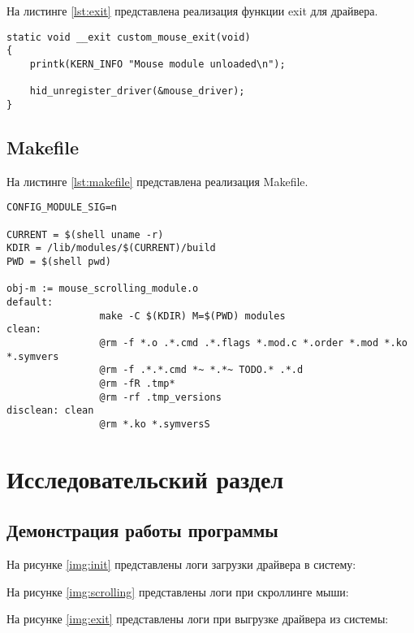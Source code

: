 \documentclass{bmstu}
\begin{document}
\clearpage

На листинге \ref{lst:exit} представлена реализация функции exit для драйвера.

\begin{lstlisting}[caption={Реализация функции exit}, label=lst:exit]
static void __exit custom_mouse_exit(void)
{
    printk(KERN_INFO "Mouse module unloaded\n");

    hid_unregister_driver(&mouse_driver);
}
\end{lstlisting}


\section{Makefile}

На листинге \ref{lst:makefile} представлена реализация Makefile.

\begin{lstlisting}[caption={Makefile}, label=lst:makefile]
CONFIG_MODULE_SIG=n

CURRENT = $(shell uname -r)
KDIR = /lib/modules/$(CURRENT)/build
PWD = $(shell pwd)

obj-m := mouse_scrolling_module.o
default: 
				make -C $(KDIR) M=$(PWD) modules 
clean: 
				@rm -f *.o .*.cmd .*.flags *.mod.c *.order *.mod *.ko *.symvers 
				@rm -f .*.*.cmd *~ *.*~ TODO.* .*.d
				@rm -fR .tmp* 
				@rm -rf .tmp_versions 
disclean: clean 
				@rm *.ko *.symversS
\end{lstlisting}

\chapter{Исследовательский раздел}

\section{Демонстрация работы программы}

На рисунке \ref{img:init} представлены логи загрузки драйвера в систему:


На рисунке \ref{img:scrolling} представлены логи при скроллинге мыши:


На рисунке \ref{img:exit} представлены логи при выгрузке драйвера из системы:

\end{document}
